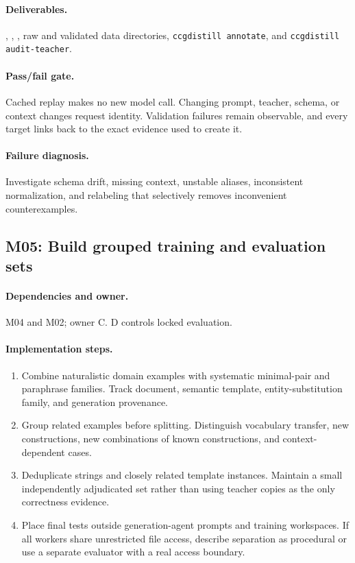 \documentclass[11pt,a4paper]{article}
\begin{document}
\paragraph{Deliverables.} , , , raw and validated data directories, \texttt{ccgdistill annotate}, and \texttt{ccgdistill audit-teacher}.

\paragraph{Pass/fail gate.} Cached replay makes no new model call. Changing prompt, teacher, schema, or context changes request identity. Validation failures remain observable, and every target links back to the exact evidence used to create it.

\paragraph{Failure diagnosis.} Investigate schema drift, missing context, unstable aliases, inconsistent normalization, and relabeling that selectively removes inconvenient counterexamples.

\subsection{M05: Build grouped training and evaluation sets}

\paragraph{Dependencies and owner.} M04 and M02; owner C. D controls locked evaluation.

\paragraph{Implementation steps.}
\begin{enumerate}
\item Combine naturalistic domain examples with systematic minimal-pair and paraphrase families. Track document, semantic template, entity-substitution family, and generation provenance.
\item Group related examples before splitting. Distinguish vocabulary transfer, new constructions, new combinations of known constructions, and context-dependent cases.
\item Deduplicate strings and closely related template instances. Maintain a small independently adjudicated set rather than using teacher copies as the only correctness evidence.
\item Place final tests outside generation-agent prompts and training workspaces. If all workers share unrestricted file access, describe separation as procedural or use a separate evaluator with a real access boundary.
\end{enumerate}
\end{document}
